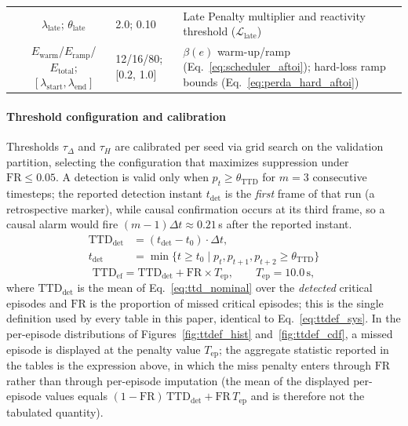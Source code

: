 \documentclass[a4paper,fleqn]{cas-dc}
\begin{document}
\begin{table}[!tbp]
\begin{tabularx}{\textwidth}{l c l X}
 & {\color{\revcolor}$\lambda_{\text{late}}$; $\theta_{\text{late}}$} & {\color{\revcolor}2.0; 0.10} & {\color{\revcolor}Late Penalty multiplier and reactivity threshold ($\mathcal{L}_{\text{late}}$)} \\
 & {\color{\revcolor}$E_{\text{warm}}$/$E_{\text{ramp}}$/$E_{\text{total}}$; $[\lambda_{\text{start}}, \lambda_{\text{end}}]$} & {\color{\revcolor}12/16/80; [0.2, 1.0]} & {\color{\revcolor}$\beta(e)$ warm-up/ramp (Eq.~\ref{eq:scheduler_aftoi}); hard-loss ramp bounds (Eq.~\ref{eq:perda_hard_aftoi})} \\
\bottomrule
\end{tabularx}
\end{table}
\paragraph{Threshold configuration and calibration}
Thresholds $\tau_\Delta$ and $\tau_H$ are calibrated per seed via grid search
on the validation partition, selecting the configuration that maximizes
suppression under $\mathrm{FR}\le0.05$. A detection is valid only when
$p_t \ge \theta_{\mathrm{TTD}}$ for $m=3$ consecutive timesteps{\color{\revcolor};
the reported detection instant $t_{\mathrm{det}}$ is the \emph{first} frame
of that run (a retrospective marker), while causal confirmation occurs at its
third frame, so a causal alarm would fire $(m{-}1)\Delta t \approx 0.21$\,s
after the reported instant}.
\begin{equation}
\begin{aligned}
\mathrm{TTD}_{\mathrm{det}} &= (t_{\mathrm{det}} - t_0)\cdot\Delta t,\\
t_{\mathrm{det}} &= \min\{t \ge t_0 \mid p_t, p_{t+1}, p_{t+2} \ge
\theta_{\mathrm{TTD}}\}
\end{aligned}
\label{eq:ttd_nominal}
\end{equation}
\begin{equation}
\mathrm{TTD}_{\mathrm{ef}} = \mathrm{TTD}_{\mathrm{det}} + \mathrm{FR}\times T_{\mathrm{ep}},
\qquad T_{\mathrm{ep}} = 10.0\,\text{s},
\label{eq:ttd_efetivo}
\end{equation}
{\color{\revcolor}where $\mathrm{TTD}_{\mathrm{det}}$ is the mean of
Eq.~\ref{eq:ttd_nominal} over the \emph{detected} critical episodes and
$\mathrm{FR}$ is the proportion of missed critical episodes; this is the
single definition used by every table in this paper, identical to
Eq.~\ref{eq:ttdef_sys}. In the per-episode distributions of
Figures~\ref{fig:ttdef_hist} and~\ref{fig:ttdef_cdf}, a missed episode is
displayed at the penalty value $T_{\mathrm{ep}}$; the aggregate statistic
reported in the tables is the expression above, in which the miss penalty
enters through $\mathrm{FR}$ rather than through per-episode imputation
(the mean of the displayed per-episode values equals
$(1-\mathrm{FR})\,\mathrm{TTD}_{\mathrm{det}} + \mathrm{FR}\,T_{\mathrm{ep}}$
and is therefore not the tabulated quantity).}
\end{document}

